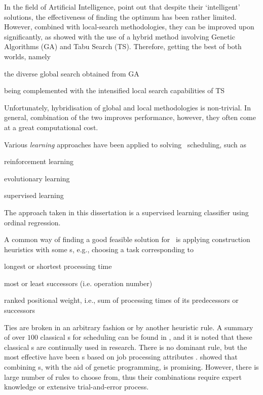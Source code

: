 In the field of Artificial Intelligence, \cite{Meeran12} point out that despite 
their `intelligent' solutions, the effectiveness of finding the optimum has 
been rather limited. However, combined with local-search methodologies, they 
can be improved upon significantly, as \citeauthor{Meeran12} showed with the 
use of a hybrid method involving Genetic Algorithms (GA) and Tabu Search (TS). 
Therefore, getting the best of both worlds, namely
\begin{enumerate*}[label={{}}]
  \item the diverse global search obtained from GA 
  \item being complemented with the intensified local search capabilities of TS
\end{enumerate*}
Unfortunately, hybridisation of global and local methodologies is non-trivial. 
In general, combination of the two improves performance, however, they often 
come at a great computational cost.  

Various \emph{learning} approaches have been applied to solving \jsp\ 
scheduling, such as
\begin{enumerate*}
  \item reinforcement learning \citep{Zhang95}
  \item evolutionary learning \citep{Tay08}
  \item supervised learning \citep{Siggi05,Malik08}
\end{enumerate*}
The approach taken in this 
dissertation is a supervised learning classifier using ordinal regression. 


A common way of finding a good feasible solution for \JSP\ is 
applying construction heuristics with some \dr s, e.g., choosing a task 
corresponding to
\begin{enumerate*}[itemjoin*={{, or }}]
  \item longest or shortest processing time
  \item most or least successors (i.e. operation number)
  \item ranked positional weight, i.e., sum of processing times of its 
  predecessors or successors
\end{enumerate*} 
Ties are broken in an arbitrary fashion or by another heuristic rule.
A summary of over $100$ classical \dr s for scheduling can be found in 
\citet{Panwalkar77}, and it is noted that these classical \dr s are continually 
used in research.  
There is no dominant rule, but the most effective have been \sdr s based on job 
processing attributes \citep{Haupt89}. \citet{Tay08} showed that combining \dr 
s, with the aid of genetic programming, is promising. However, there is large 
number of rules to choose from, thus their combinations require expert 
knowledge or extensive trial-and-error process.

